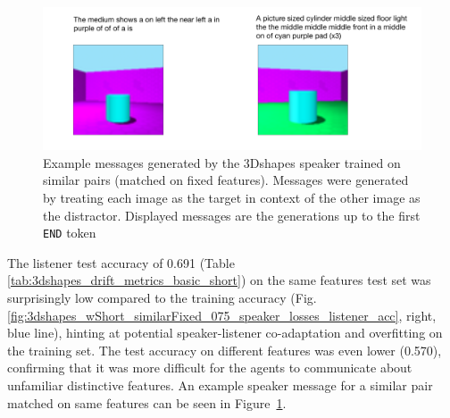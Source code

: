 \begin{figure}[h]
	\centering
	\includegraphics[width=0.9\linewidth]{images/example_generations/shapes_similarPair_cropped.pdf}
	\caption{Example messages generated by the 3Dshapes speaker trained on similar pairs (matched on fixed features). Messages were generated by treating each image as the target in context of the other image as the distractor. Displayed messages are the generations up to the first \texttt{END} token}
	\label{fig:shapes_similarPairs_example_generations}
\end{figure}
The listener test accuracy of 0.691 (Table \ref{tab:3dshapes_drift_metrics_basic_short}) on the same features test set was surprisingly low compared to the training accuracy (Fig. \ref{fig:3dshapes_wShort_similarFixed_075_speaker_losses_listener_acc}, right, blue line), hinting at potential speaker-listener co-adaptation and overfitting on the training set. The test accuracy on different features was even lower (0.570), confirming that it was more difficult for the agents to communicate about unfamiliar distinctive features. An example speaker message for a similar pair matched on same features can be seen in Figure~\ref{fig:shapes_similarPairs_example_generations}.

